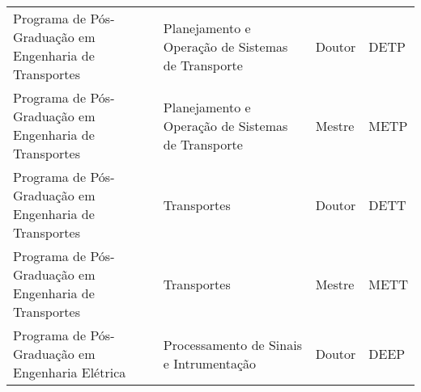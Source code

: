 \begin{apendicesenv}
\begin{quadro}[htb]
\begin{tabular}{|p{6.0cm}|p{4.5cm}|p{2.0cm}|p{1.75cm}|}
Programa de Pós-Graduação em Engenharia de Transportes & Planejamento e Operação de Sistemas de Transporte & Doutor & DETP \\
Programa de Pós-Graduação em Engenharia de Transportes & Planejamento e Operação de Sistemas de Transporte & Mestre & METP \\
Programa de Pós-Graduação em Engenharia de Transportes & Transportes & Doutor & DETT \\
Programa de Pós-Graduação em Engenharia de Transportes & Transportes & Mestre & METT \\
Programa de Pós-Graduação em Engenharia Elétrica & Processamento de Sinais e Intrumentação & Doutor & DEEP \\

\end{tabular}
\end{quadro} 


\end{apendicesenv}
